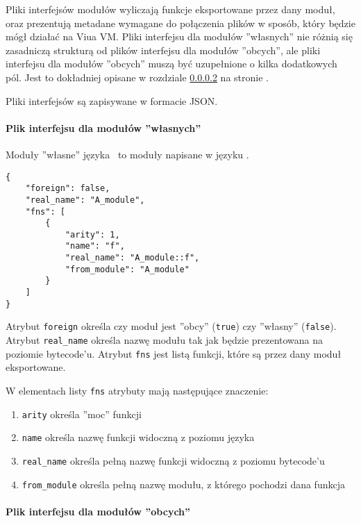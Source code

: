 Pliki interfejsów modułów wyliczają funkcje eksportowane przez dany moduł, oraz prezentują metadane wymagane
do połączenia plików w sposób, który będzie mógł działać na Viua VM. Pliki interfejsu dla modułów ''własnych''
nie różnią się zasadniczą strukturą od plików interfejsu dla modułów ''obcych'', ale pliki interfejsu dla
modułów ''obcych'' muszą być uzupełnione o kilka dodatkowych pól. Jest to dokładniej opisane w rozdziale
\ref{pliki_interfejsow_modulow_obcych} na stronie \pageref{pliki_interfejsow_modulow_obcych}.

Pliki interfejsów są zapisywane w formacie JSON.

\paragraph{Plik interfejsu dla modułów ''własnych''}

Moduły ''własne'' języka \ViuAct\ to moduły napisane w języku \ViuAct.

\begin{small}
\begin{lstlisting}
{
    "foreign": false,
    "real_name": "A_module",
    "fns": [
        {
            "arity": 1,
            "name": "f",
            "real_name": "A_module::f",
            "from_module": "A_module"
        }
    ]
}
\end{lstlisting}
\end{small}

Atrybut \texttt{foreign} określa czy moduł jest ''obcy'' (\texttt{true}) czy ''własny'' (\texttt{false}).
Atrybut \texttt{real\_name} określa nazwę modułu tak jak będzie prezentowana na poziomie bytecode'u.
Atrybut \texttt{fns} jest listą funkcji, które są przez dany moduł eksportowane.

W elementach listy \texttt{fns} atrybuty mają następujące znaczenie:

\begin{enumerate}
    \item \texttt{arity} określa ''moc'' funkcji
    \item \texttt{name} określa nazwę funkcji widoczną z poziomu języka \ViuAct
    \item \texttt{real\_name} określa pełną nazwę funkcji widoczną z poziomu bytecode'u
    \item \texttt{from\_module} określa pełną nazwę modułu, z którego pochodzi dana funkcja
\end{enumerate}

\paragraph{Plik interfejsu dla modułów ''obcych''}
\label{pliki_interfejsow_modulow_obcych}

